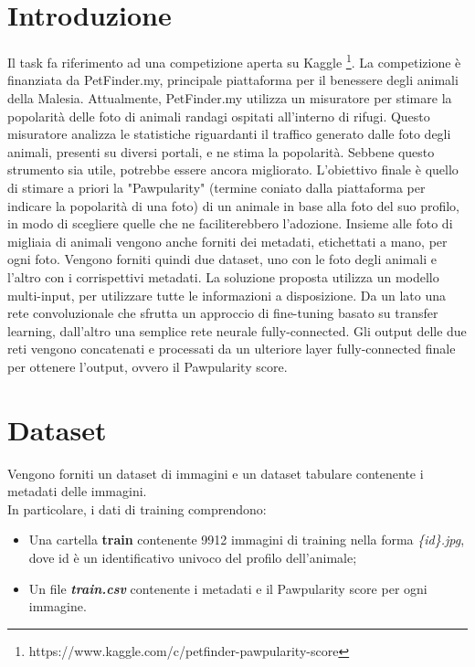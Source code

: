 \section{Introduzione}
    Il task fa riferimento ad una competizione aperta su Kaggle \footnote{https://www.kaggle.com/c/petfinder-pawpularity-score}.
    La competizione è finanziata da PetFinder.my, principale piattaforma per il benessere degli animali della Malesia. Attualmente, PetFinder.my utilizza un misuratore per stimare la popolarità delle foto di animali randagi ospitati all'interno di rifugi. Questo misuratore analizza le statistiche riguardanti il traffico generato dalle foto degli animali, presenti su diversi portali, e ne stima la popolarità. Sebbene questo strumento sia utile, potrebbe essere ancora migliorato. L'obiettivo finale è quello di stimare a priori la "Pawpularity" (termine coniato dalla piattaforma per indicare la popolarità di una foto) di un animale in base alla foto del suo profilo, in modo di scegliere quelle che ne faciliterebbero l'adozione. Insieme alle foto di migliaia di animali vengono anche forniti dei metadati, etichettati a mano, per ogni foto. Vengono forniti quindi due dataset, uno con le foto degli animali e l'altro con i corrispettivi metadati.
    La soluzione proposta utilizza un modello multi-input, per utilizzare tutte le informazioni a disposizione. Da un lato una rete convoluzionale che sfrutta un approccio di fine-tuning basato su transfer learning, dall'altro una semplice rete neurale fully-connected. Gli output delle due reti vengono concatenati e processati da un ulteriore layer fully-connected finale per ottenere l'output, ovvero il Pawpularity score.


\section{Dataset}
    Vengono forniti un dataset di immagini e un dataset tabulare contenente i metadati delle immagini.\\ In particolare, i dati di training comprendono:
    \begin{itemize}
        \item Una cartella \textbf{train} contenente 9912 immagini di training nella forma \textit{\{id\}.jpg}, dove id è un identificativo univoco del profilo dell'animale;
        \item Un file \textbf{\textit{train.csv}} contenente i metadati e il Pawpularity score per ogni immagine.
    \end{itemize}

